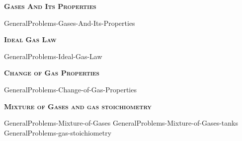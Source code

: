\documentclass[main.tex]{subfiles}
\newcommand\chapterlabel{Ch-Gas}
\begin{document}
\newpage
\setdoublesep{0.35700 em}  %
\setatomsep{1.78500 em}    %
\setbondoffset{0.18265 em} %
\renewcommand{\bondwidth}{0.06642 em} %
\setbondstyle{line width = \bondwidth}
\fancyhfoffset[E,O]{0pt}
\setlength{\columnsep}{30pt}
\begin{conclusion}
\end{conclusion}
\begin{multicols*}{2}\setcounter{numA}{1}

{\raggedright\textsc{\textbf{Gases And Its Properties }}\par}
{GeneralProblems-Gases-And-Its-Properties}

\iftoggle{chem121}{}{
{GeneralProblems-Measuring-pressure}
}

{\raggedright\textsc{\textbf{Ideal Gas Law }}\par}
{GeneralProblems-Ideal-Gas-Law }
{\raggedright\textsc{\textbf{Change of Gas Properties }}\par}
{GeneralProblems-Change-of-Gas-Properties}
{\raggedright\textsc{\textbf{Mixture of Gases and gas stoichiometry }}\par}
{GeneralProblems-Mixture-of-Gases}
{GeneralProblems-Mixture-of-Gases-tanks}
{GeneralProblems-gas-stoichiometry}
 
\iftoggle{chem121}{}{
{\raggedright\textsc{\textbf{Real gases and the kinetic molecular theory of gases }}\par}
{GeneralProblems-Real-gases-and-the-kinetic-molecular-theory-of-gases}
\clearpage\thispagestyle{empty}\mbox{}\clearpage

}
\end{multicols*} \iftoggle{showfinalanswers}{
\newpage\fancyhfoffset[E,O]{0pt}
\begin{answerbox}
\begin{answersenvironment}
 \begin{localsize}{10}
{ \checkoddpage\ifoddpage    \else   \clearpage\thispagestyle{empty}\mbox{}\clearpage\fi
\Large \bf Answers}
\SetupExSheets{ headings = inline-nr , counter-format = qu) ,}
\printsolutions 
  \vspace{20cm}
 \end{localsize}
 \end{answersenvironment}
\end{answerbox}
}{}
\checkoddpage\ifoddpage   \clearpage\thispagestyle{empty}\mbox{}\clearpage \else   \fi
\end{document}
